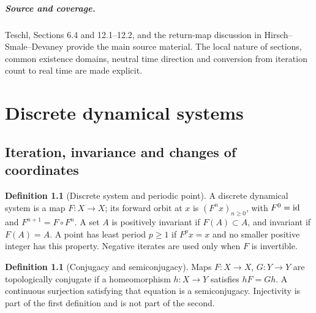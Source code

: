 \documentclass[11pt,oneside]{book}
\theoremstyle{definition}
\newtheorem{definition}[theorem]{Definition}
\theoremstyle{remark}\newtheorem{remark}[theorem]{Remark}
\begin{document}
\paragraph{Source and coverage.}
Teschl, Sections 6.4 and 12.1--12.2, and the return-map discussion in
Hirsch--Smale--Devaney provide the main source material. The local nature
of sections, common existence domains, neutral time direction and
conversion from iteration count to real time are made explicit.



\chapter{Discrete dynamical systems}\label{ch:d13-15}

\section{Iteration, invariance and changes of coordinates}

\begin{definition}[Discrete system and periodic point]\label{d13:15:discrete-system}
A discrete dynamical system is a map \(F:X\to X\); its forward orbit at \(x\)
is \((F^n x)_{n\geq0}\), with \(F^0=\operatorname{id}\) and \(F^{n+1}=F\circ F^n\).
A set \(A\) is positively invariant if \(F(A)\subset A\), and invariant if
\(F(A)=A\). A point has least period \(p\geq1\) if \(F^p x=x\) and no
smaller positive integer has this property. Negative iterates are used only
when \(F\) is invertible.
\end{definition}

\begin{definition}[Conjugacy and semiconjugacy]\label{d13:15:conjugacy-definition}
Maps \(F:X\to X\), \(G:Y\to Y\) are topologically conjugate if a
homeomorphism \(h:X\to Y\) satisfies \(hF=Gh\). A continuous surjection
satisfying that equation is a semiconjugacy. Injectivity is part of the
first definition and is not part of the second.
\end{definition}
\end{document}
